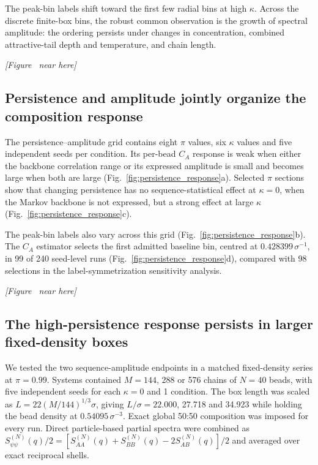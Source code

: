 \documentclass[pdflatex,sn-nature,onecolumn]{sn-jnl}
\newcommand{\figurecallout}[1]{%
  \refstepcounter{figure}\label{#1}%
  \begin{center}\textit{[Figure \thefigure\ near here]}\end{center}}
\begin{document}
The peak-bin labels shift toward the first few radial bins at high $\kappa$. Across the discrete finite-box bins, the robust common observation is the growth of spectral amplitude: the ordering persists under changes in concentration, combined attractive-tail depth and temperature, and chain length.

\figurecallout{fig:kappa_controls}

\subsection{Persistence and amplitude jointly organize the composition response}

The persistence--amplitude grid contains eight $\pi$ values, six $\kappa$ values and five independent seeds per condition. Its per-bead $C_A$ response is weak when either the backbone correlation range or its expressed amplitude is small and becomes large when both are large (Fig.~\ref{fig:persistence_response}a). Selected $\pi$ sections show that changing persistence has no sequence-statistical effect at $\kappa=0$, when the Markov backbone is not expressed, but a strong effect at large $\kappa$ (Fig.~\ref{fig:persistence_response}c).

The peak-bin labels also vary across this grid (Fig.~\ref{fig:persistence_response}b). The $C_A$ estimator selects the first admitted baseline bin, centred at $0.428399\,\sigma^{-1}$, in 99 of 240 seed-level runs (Fig.~\ref{fig:persistence_response}d), compared with 98 selections in the label-symmetrization sensitivity analysis.

\figurecallout{fig:persistence_response}

\subsection{The high-persistence response persists in larger fixed-density boxes}

We tested the two sequence-amplitude endpoints in a matched fixed-density series at $\pi=0.99$. Systems contained $M=144$, 288 or 576 chains of $N=40$ beads, with five independent seeds for each $\kappa=0$ and 1 condition. The box length was scaled as $L=22(M/144)^{1/3}\sigma$, giving $L/\sigma=22.000$, 27.718 and 34.923 while holding the bead density at $0.54095\,\sigma^{-3}$. Exact global 50:50 composition was imposed for every run. Direct particle-based partial spectra were combined as $S_{\psi\psi}^{(N)}(q)/2=[S_{AA}^{(N)}(q)+S_{BB}^{(N)}(q)-2S_{AB}^{(N)}(q)]/2$ and averaged over exact reciprocal shells.
\end{document}
